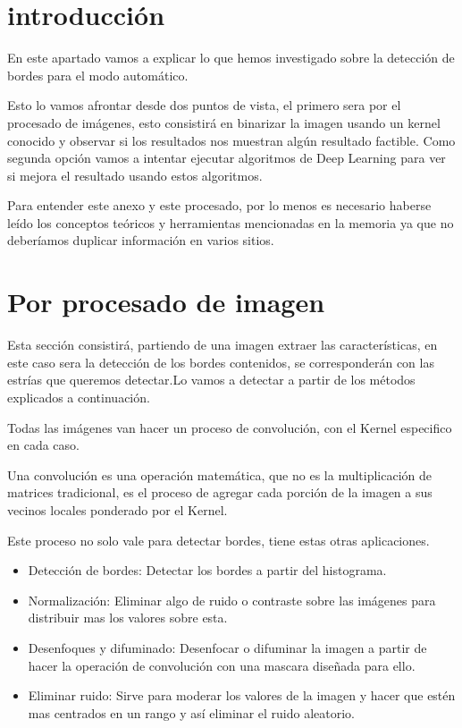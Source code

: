 
\section{introducción}
En este apartado vamos a explicar lo que hemos investigado sobre la detección de bordes para el modo automático.

Esto lo vamos afrontar desde dos puntos de vista, el primero sera por el procesado de imágenes, esto consistirá en binarizar la imagen usando un kernel conocido y observar si los resultados nos muestran algún resultado factible.
Como segunda opción vamos a intentar ejecutar algoritmos de Deep Learning para ver si mejora el resultado usando estos algoritmos.

Para entender este anexo y este procesado, por lo menos es necesario haberse leído los conceptos teóricos y herramientas mencionadas en la memoria ya que no deberíamos duplicar información en varios sitios.

\section{Por procesado de imagen}
Esta sección consistirá, partiendo de una imagen extraer las características, en este caso sera la detección de los bordes contenidos, se corresponderán con las estrías que queremos detectar.Lo vamos a detectar a partir de los métodos explicados a continuación. 

Todas las imágenes van hacer un proceso de convolución, con el Kernel \cite{wiki:kernels} especifico en cada caso.

Una convolución es una operación matemática, que no es la multiplicación de matrices tradicional, es el proceso de agregar cada porción de la imagen a sus vecinos locales ponderado por el Kernel. 

Este proceso no solo vale para detectar bordes, tiene estas otras aplicaciones.
\begin{itemize}
\item Detección de bordes: Detectar los bordes a partir del histograma.
\item Normalización: Eliminar algo de ruido o contraste sobre las imágenes para distribuir mas los valores sobre esta.
\item Desenfoques y difuminado: Desenfocar o difuminar la imagen a partir de hacer la operación de convolución con una mascara diseñada para ello.
\item Eliminar ruido: Sirve para moderar los valores de la imagen  y hacer que estén mas centrados en un rango y así eliminar el ruido aleatorio. 
\end{itemize}


